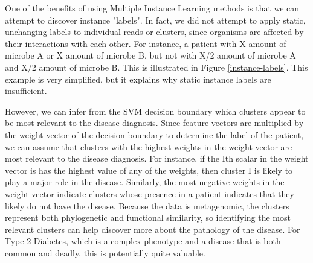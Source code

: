 One of the benefits of using Multiple Instance Learning methods is that we can attempt to discover instance "labels". In fact, we did not attempt to apply static, unchanging labels to individual reads or clusters, since organisms are affected by their interactions with each other. For instance, a patient with X amount of microbe A or X amount of microbe B, but not with X/2 amount of microbe A and X/2 amount of microbe B. This is illustrated in Figure \ref{instance-labels}. This example is very simplified, but it explains why static instance labels are insufficient.

However, we can infer from the SVM decision boundary which clusters appear to be most relevant to the disease diagnosis. Since feature vectors are multiplied by the weight vector of the decision boundary to determine the label of the patient, we can assume that clusters with the highest weights in the weight vector are most relevant to the disease diagnosis. For instance, if the Ith scalar in the weight vector is has the highest value of any of the weights, then cluster I is likely to play a major role in the disease. Similarly, the most negative weights in the weight vector indicate clusters whose presence in a patient indicates that they likely do not have the disease. Because the data is metagenomic, the clusters represent both phylogenetic and functional similarity, so identifying the most relevant clusters can help discover more about the pathology of the disease. For Type 2 Diabetes, which is a complex phenotype and a disease that is both common and deadly, this is potentially quite valuable.